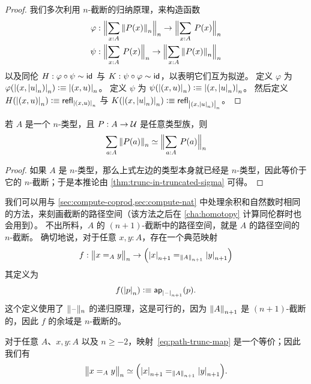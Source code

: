 \begin{proof}
我们多次利用 $n$-截断的归纳原理，来构造函数
\begin{align*}
\varphi & : \Trunc n{\sm{x:A}\trunc n{P(x)}}\to\Trunc n{\sm{x:A}P(x)}\\
\psi & : \Trunc n{\sm{x:A}P(x)}\to \Trunc n{\sm{x:A} \trunc n{P(x)}}
\end{align*}
以及同伦 $H:\varphi\circ\psi\htpy \idfunc$ 与 $K:\psi\circ\varphi\htpy
\idfunc$，以表明它们互为拟逆。
定义 $\varphi$ 为 $\varphi(\tproj n{\pairr{x,\tproj nu}})\defeq\tproj n{\pairr{x,u}}$。
定义 $\psi$ 为 $\psi(\tproj n{\pairr{x,u}})\defeq\tproj n{\pairr{x,\tproj nu}}$。
然后定义 $H(\tproj n{\pairr{x,u}})\defeq \refl{\tproj n{\pairr{x,u}}}$ 与
$K(\tproj n{\pairr{x,\tproj nu}})\defeq \refl{\tproj n{\pairr{x,\tproj nu}}}$。
\end{proof}

\begin{cor}\label{thm:refl-over-ntype-base}
  若 $A$ 是一个 $n$-类型，且 $P:A\to\type$ 是任意类型族，则
  \[ \eqv{\sm{a:A} \trunc n{P(a)}}{\Trunc n{\sm{a:A}P(a)}} \]
\end{cor}

\begin{proof}
  如果 $A$ 是 $n$-类型，那么上式左边的类型本身就已经是 $n$-类型，因此等价于它的 $n$-截断；于是本推论由 \cref{thm:trunc-in-truncated-sigma} 可得。
\end{proof}

我们可以用与 \cref{sec:compute-coprod,sec:compute-nat} 中处理余积和自然数时相同的方法，来刻画截断的路径空间（该方法之后在 \cref{cha:homotopy} 计算同伦群时也会用到）。
不出所料，$A$ 的 $(n+1)$-截断中的路径空间，就是 $A$ 的路径空间的 $n$-截断。
确切地说，对于任意 $x,y:A$，存在一个典范映射
\begin{equation}
  f:\ttrunc n{x=_Ay}\to \Big(\tproj {n+1}x=_{\trunc{n+1}A}\tproj {n+1}y\Big)\label{eq:path-trunc-map}
\end{equation}
其定义为
\[f(\tproj n{p})\defeq \apfunc{\tprojf {n+1}}(p). \]
这个定义使用了 $\truncf n$ 的递归原理，这是可行的，因为 $\trunc {n+1}A$ 是 $(n+1)$-截断的，因此 $f$ 的余域是 $n$-截断的。

\begin{thm} \label{thm:path-truncation}
  对于任意 $A$、$x,y:A$ 以及 $n\ge -2$，映射~\eqref{eq:path-trunc-map} 是一个等价；因此我们有
  \[ \eqv{\ttrunc n{x=_Ay}}{\Big(\tproj {n+1}x=_{\trunc{n+1}A}\tproj {n+1}y\Big)}. \]
\end{thm}

